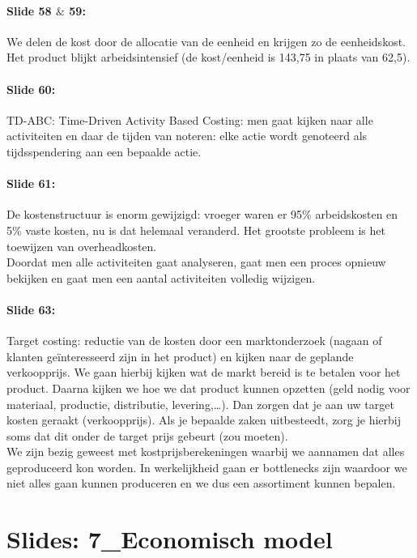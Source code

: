 \documentclass[10pt,a4paper]{report}
\begin{document}
\paragraph{Slide 58 $\&$ 59:} We delen de kost door de allocatie van de eenheid en krijgen zo de eenheidskost. Het product blijkt arbeidsintensief (de kost/eenheid is 143,75 in plaats van 62,5).

\paragraph{Slide 60:} TD-ABC: Time-Driven Activity Based Costing: men gaat kijken naar alle activiteiten en daar de tijden van noteren: elke actie wordt genoteerd als tijdsspendering aan een bepaalde actie.

\paragraph{Slide 61:} De kostenstructuur is enorm gewijzigd: vroeger waren er 95\% arbeidskosten en 5\% vaste kosten, nu is dat helemaal veranderd. Het grootste probleem is het toewijzen van overheadkosten.\\
Doordat men alle activiteiten gaat analyseren, gaat men een proces opnieuw bekijken en gaat men een aantal activiteiten volledig wijzigen.

\paragraph{Slide 63:} Target costing: reductie van de kosten door een marktonderzoek (nagaan of klanten ge\"interesseerd zijn in het product) en kijken naar de geplande verkoopprijs. We gaan hierbij kijken wat de markt bereid is te betalen voor het product. Daarna kijken we hoe we dat product kunnen opzetten (geld nodig voor materiaal, productie, distributie, levering,…). Dan zorgen dat je aan uw target kosten geraakt (verkoopprijs). Als je bepaalde zaken uitbesteedt, zorg je hierbij soms dat dit onder de target prijs gebeurt (zou moeten).\\
We zijn bezig geweest met kostprijsberekeningen waarbij we aannamen dat alles geproduceerd kon worden. In werkelijkheid gaan er bottlenecks zijn waardoor we niet alles gaan kunnen produceren en we dus een assortiment kunnen bepalen. 

\section{Slides: 7\_Economisch model}
\end{document}
